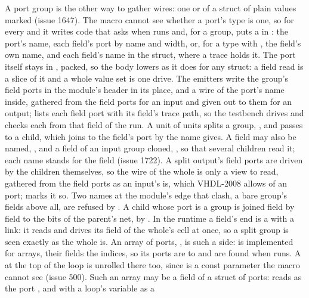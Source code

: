 A port group is the other way to gather wires: one  or
 of a struct of plain values marked 
(issue 1647). The macro cannot see whether a port's type is one, so
for every  and  it writes code that asks
 when  runs and, for a group, puts a
 in : the port's name, each
field's port by name and width,  or, for a type with
, the field's own name, and each field's name in the struct,
where a trace holds it. The port itself stays in , packed,
so the body lowers as it does for any struct: a field read is a slice
of it and a whole value set is one drive. The emitters write the
group's field ports in the module's header in its place, and a wire of
the port's name inside, gathered from the field ports for an input and
given out to them for an output;  lists each field
port with its field's trace path, so the testbench drives and checks
each from that field of the run. A unit of units splits a group,
, and passes  to a child, which
 joins to the field's port by the name
 gives. A field may also be named, , and a field
of an input group cloned, , so that several
children read it; each name stands for the field (issue 1722). A split
output's field ports are
driven by the children themselves, so the wire of the whole is only a
view to read, gathered from the field ports as an input's is, which
VHDL-2008 allows of an  port;  marks
it so. Two names at the module's edge that clash, a bare group's
fields above all, are refused by . A child whose port is a
group is joined field by field to the bits of the parent's net, by
. In the runtime a field's end is a 
with a link: it reads and drives its field of the whole's cell at
once, so a split group is seen exactly as the whole is.
An array of ports, \code{[Rx<T>; N]}, is such a side:  is
implemented for arrays, their fields the indices, so its ports are
 to  and are found when 
runs. A  at the top of the loop is unrolled
there too, since  is a const parameter the macro cannot see
(issue 500). Such an array may be a field of a struct of ports:
 reads  as the port
, and  with a loop's variable as a
